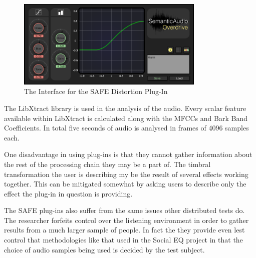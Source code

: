 			\begin{figure}[h!]
				\centering
				\includegraphics[width=0.8\textwidth]{chapter4/Images/SAFEDistortion.png}
				\caption{The Interface for the SAFE Distortion Plug-In}
				\label{fig:SAFE-Distortion}
			\end{figure}

			The LibXtract library \citep{bullock2007libxtract} is used in the analysis of the audio. Every
			scalar feature available within LibXtract is calculated along with the MFCCs and Bark Band
			Coefficients. In total five seconds of audio is analysed in frames of 4096 samples each.


			One disadvantage in using plug-ins is that they cannot gather information about the rest of the
			processing chain they may be a part of. The timbral transformation the user is describing my be the
			result of several effects working together. This can be mitigated somewhat by asking users to
			describe only the effect the plug-in in question is providing.

			The SAFE plug-ins also suffer from the same issues other distributed tests do. The researcher
			forfeits control over the listening environment in order to gather results from a much larger sample
			of people. In fact the they provide even lest control that methodologies like that used in the
			Social EQ project \citep{cartwright2013socialeq} in that the choice of audio samples being used is
			decided by the test subject. 
